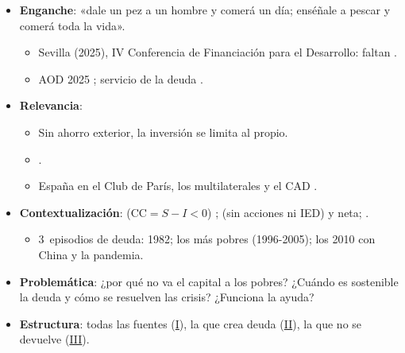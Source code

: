\documentclass{article}
\begin{document}
\cabecerarepaso
\begin{columnas}

\begin{itemize}
\item \textbf{Enganche}: «dale un pez a un hombre y comerá un día; enséñale a pescar y comerá toda la vida».
  \begin{itemize}
  \item Sevilla (2025), IV Conferencia de Financiación para el Desarrollo: faltan .
  \item AOD 2025 ; servicio de la deuda .
  \end{itemize}
\item \textbf{Relevancia}:
  \begin{itemize}
  \item Sin ahorro exterior, la inversión se limita al propio.
  \item {}.
  \item España en el Club de París, los multilaterales y el CAD  .
  \end{itemize}
\item \textbf{Contextualización}:  ($\mathrm{CC}=S-I<0$) ;  (sin acciones ni IED) y neta; .
  \begin{itemize}
  \item 3~episodios de deuda: 1982; los más pobres (1996-2005); los 2010 con China y la pandemia.
  \end{itemize}
\item \textbf{Problemática}: ¿por qué no va el capital a los pobres? ¿Cuándo es sostenible la deuda y cómo se resuelven las crisis? ¿Funciona la ayuda?
\item \textbf{Estructura}: todas las fuentes (\hyperref[rep:I]{I}), la que crea deuda (\hyperref[rep:II]{II}), la que no se devuelve (\hyperref[rep:III]{III}).
\end{itemize}


\end{columnas}
\end{document}
